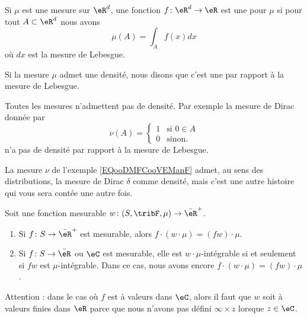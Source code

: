 \begin{definition}
	Si \( \mu\) est une mesure sur \( \eR^d\), une fonction \( f\colon \eR^d\to \eR\) est une  pour \( \mu\) si pour tout \( A\subset\eR^d\) nous avons
	\begin{equation}
		\mu(A)=\int_Af(x)dx
	\end{equation}
	où \( dx\) est la mesure de Lebesgue.

	Si la mesure \( \mu\) admet une densité, nous disons que c'est une  par rapport à la mesure de Lebesgue.
\end{definition}

\begin{example}
	Toutes les mesures n'admettent pas de densité. Par exemple la mesure de Dirac donnée par
	\begin{equation}        \label{EQooDMFCooVEManF}
		\nu(A)=\begin{cases}
			1 & \text{si } 0\in A \\
			0 & \text{sinon. }
		\end{cases}
	\end{equation}
	n'a pas de densité par rapport à la mesure de Lebesgue.
\end{example}

La mesure \( \nu\) de l'exemple \ref{EQooDMFCooVEManF} admet, au sens des distributions, la mesure de Dirac \( \delta\) comme densité, mais c'est une autre histoire qui vous sera contée une autre fois.

\begin{proposition}  \label{PropooJMWAooDzfpmB}
	Soit une fonction mesurable \( w\colon (S,\tribF,\mu)\to \bar \eR^+\).
	\begin{enumerate}
		\item
		      Si \( f\colon S\to \bar\eR^+\) est mesurable, alors \( f\cdot(w\cdot \mu)=(fw)\cdot \mu\).
		\item
		      Si \( f\colon S\to \bar \eR\) ou \( \eC\) est mesurable, elle est \( w\cdot\mu\)-intégrable si et seulement si \( fw\) est \( \mu\)-intégrable. Dans ce cas, nous avons encore \( f\cdot(w\cdot \mu)=(fw)\cdot\mu\).
	\end{enumerate}
	Attention : dans le cas où \( f\) est à valeurs dans \( \eC\), alors il faut que \( w\) soit à valeurs finies dans \( \eR\) parce que nous n'avons pas défini \( \infty\times z\) lorsque \( z\in \eC\).
\end{proposition}

